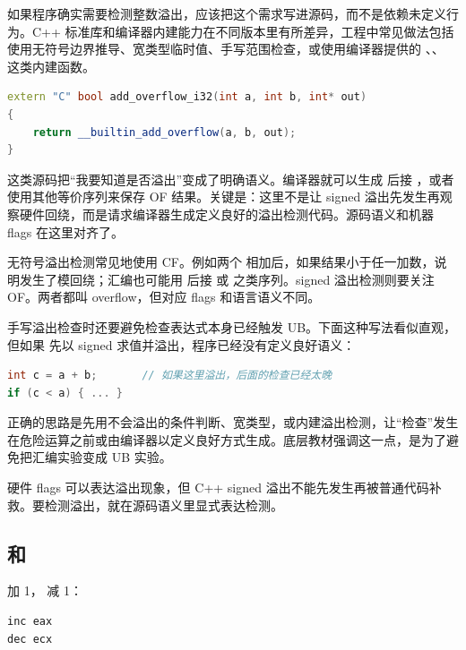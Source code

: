如果程序确实需要检测整数溢出，应该把这个需求写进源码，而不是依赖未定义行为。C++ 标准库和编译器内建能力在不同版本里有所差异，工程中常见做法包括使用无符号边界推导、宽类型临时值、手写范围检查，或使用编译器提供的 、、 这类内建函数。

\begin{lstlisting}[language=C++]
extern "C" bool add_overflow_i32(int a, int b, int* out)
{
    return __builtin_add_overflow(a, b, out);
}
\end{lstlisting}

这类源码把“我要知道是否溢出”变成了明确语义。编译器就可以生成  后接 ，或者使用其他等价序列来保存 OF 结果。关键是：这里不是让 signed 溢出先发生再观察硬件回绕，而是请求编译器生成定义良好的溢出检测代码。源码语义和机器 flags 在这里对齐了。

无符号溢出检测常见地使用 CF。例如两个  相加后，如果结果小于任一加数，说明发生了模回绕；汇编也可能用  后接  或  之类序列。signed 溢出检测则要关注 OF。两者都叫 overflow，但对应 flags 和语言语义不同。

手写溢出检查时还要避免检查表达式本身已经触发 UB。下面这种写法看似直观，但如果  先以 signed  求值并溢出，程序已经没有定义良好语义：

\begin{lstlisting}[language=C++]
int c = a + b;       // 如果这里溢出，后面的检查已经太晚
if (c < a) { ... }
\end{lstlisting}

正确的思路是先用不会溢出的条件判断、宽类型，或内建溢出检测，让“检查”发生在危险运算之前或由编译器以定义良好方式生成。底层教材强调这一点，是为了避免把汇编实验变成 UB 实验。

\begin{warningbox}
硬件 flags 可以表达溢出现象，但 C++ signed 溢出不能先发生再被普通代码补救。要检测溢出，就在源码语义里显式表达检测。
\end{warningbox}

\subsection{ 和 }

 加 1， 减 1：

\begin{lstlisting}
inc eax
dec ecx
\end{lstlisting}


